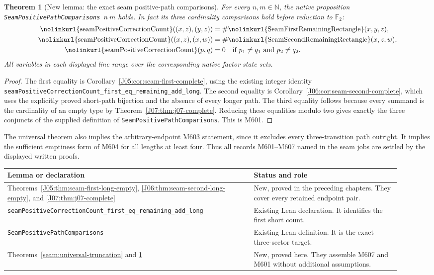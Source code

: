 \documentclass[11pt,oneside]{report}
\newtheorem{theorem}{Theorem}[section]
\theoremstyle{definition}
\numberwithin{equation}{section}
\newcommand{\decl}[1]{\textnormal{\nolinkurl{#1}}}
\begin{document}
\begin{theorem}[New lemma: the exact seam positive-path comparisons]
\label{seam:positive-comparisons}
For every $n,m\in\mathbb N$, the native proposition
\decl{SeamPositivePathComparisons}\ $n\ m$ holds.
In fact its three cardinality comparisons hold before reduction to
$\mathbb F_2$:
\begin{align*}
 \decl{seamPositiveCorrectionCount}((x,z),(y,z))
 &=\#\decl{SeamFirstRemainingRectangle}(x,y,z),\\
 \decl{seamPositiveCorrectionCount}((x,z),(x,w))
 &=\#\decl{SeamSecondRemainingRectangle}(x,z,w),\\
 \decl{seamPositiveCorrectionCount}(p,q)&=0
 \quad\text{if }p_1\ne q_1\text{ and }p_2\ne q_2.
\end{align*}
All variables in each displayed line range over the corresponding
native factor state sets.
\end{theorem}
\begin{proof}
The first equality is Corollary~\ref{J05:cor:seam-first-complete},
using the existing integer identity
\decl{seamPositiveCorrectionCount_first_eq_remaining_add_long}.
The second equality is Corollary~\ref{J06:cor:seam-second-complete},
which uses the explicitly proved short-path bijection and the absence
of every longer path. The third equality follows because every
summand is the cardinality of an empty type by
Theorem~\ref{J07:thm:j07-complete}. Reducing these equalities modulo
two gives exactly the three conjuncts of the supplied definition of
\decl{SeamPositivePathComparisons}. This is M601.
\end{proof}

The universal theorem also implies the arbitrary-endpoint M603
statement, since it excludes every three-transition path outright.
It implies the sufficient emptiness form of M604 for all lengths at
least four. Thus all records M601--M607 named in the seam jobs are
settled by the displayed written proofs.

\begin{longtable}{@{}>{\raggedright\arraybackslash}p{0.58\linewidth}>{\raggedright\arraybackslash}p{0.34\linewidth}@{}}
\textbf{Lemma or declaration}&\textbf{Status and role}\\\hline\endhead
Theorems~\ref{J05:thm:seam-first-long-empty},
\ref{J06:thm:seam-second-long-empty}, and
\ref{J07:thm:j07-complete}&New, proved in the preceding chapters.
They cover every retained endpoint pair.\\
\decl{seamPositiveCorrectionCount_first_eq_remaining_add_long}
&Existing Lean declaration. It identifies the first short count.\\
\decl{SeamPositivePathComparisons}
&Existing Lean definition. It is the exact three-sector target.\\
Theorems~\ref{seam:universal-truncation} and
\ref{seam:positive-comparisons}&New, proved here. They assemble
M607 and M601 without additional assumptions.\\\hline
\end{longtable}
\end{document}

